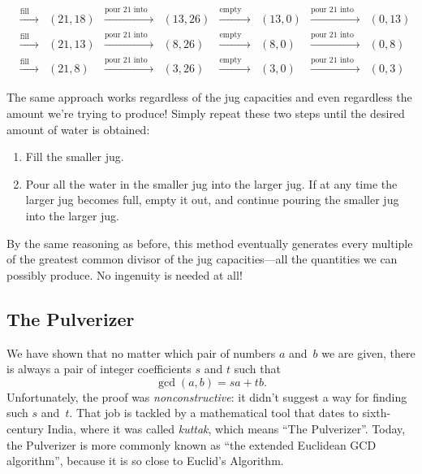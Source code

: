 \[\begin{array}{ccccccccc}
& \xrightarrow{\text{fill 21}} & (21,18)& \xrightarrow{\text{pour 21 into 26}} & (13,26)& \xrightarrow{\text{empty 26}} & (13,0)& \xrightarrow{\text{pour 21 into 26}} & (0,13)\\
& \xrightarrow{\text{fill 21}} & (21,13)& \xrightarrow{\text{pour 21 into 26}} & (8,26)& \xrightarrow{\text{empty 26}} & (8,0)& \xrightarrow{\text{pour 21 into 26}} & (0,8)\\
& \xrightarrow{\text{fill 21}} & (21,8)& \xrightarrow{\text{pour 21 into 26}} & (3,26)& \xrightarrow{\text{empty 26}} & (3,0)& \xrightarrow{\text{pour 21 into 26}} & (0,3)
\end{array}
\]
%

The same approach works regardless of the jug capacities and even
regardless the amount we're trying to produce!  Simply repeat these two
steps until the desired amount of water is obtained:
\begin{enumerate}
\item Fill the smaller jug.
\item Pour all the water in the smaller jug into the larger jug.
If at any time the larger jug becomes full, empty it out, and continue
pouring the smaller jug into the larger jug.
\end{enumerate}
By the same reasoning as before, this method eventually generates every
multiple of the greatest common divisor of the jug capacities---all the
quantities we can possibly produce.  No ingenuity is needed at all!


\subsection{The Pulverizer}
\label{sec:pulverizer}

We have shown that no matter which pair of numbers $a$ and~$b$ we
are given, there is always a pair of integer coefficients $s$ and $t$
such that
\[
\gcd(a, b)  =  s a + t b.
\]
Unfortunately, the proof was \emph{nonconstructive}: it didn't suggest
a way for finding such $s$ and~$t$.  That job is tackled by a
mathematical tool that dates to sixth-century India, where it was
called \emph{kuttak}, which means ``The Pulverizer''.  Today, the
Pulverizer is more commonly known as ``the extended Euclidean GCD
algorithm'', because it is so close to Euclid's Algorithm.

